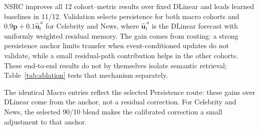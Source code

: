 NSRC improves all 12 cohort--metric results over fixed DLinear and leads learned baselines in 11/12. Validation selects persistence for both macro cohorts and $0.9\mathbf p+0.1\hat{\mathbf u}^{\,a}_t$ for Celebrity and News, where $\hat{\mathbf u}^{\,a}_t$ is the DLinear forecast with uniformly weighted residual memory. The gain comes from routing: a strong persistence anchor limits transfer when event-conditioned updates do not validate, while a small residual-path contribution helps in the other cohorts. These end-to-end results do not by themselves isolate semantic retrieval; Table~\ref{tab:ablation} tests that mechanism separately.

The identical Macro entries reflect the selected Persistence route: these gains over DLinear come from the anchor, not a residual correction. For Celebrity and News, the selected 90/10 blend makes the calibrated correction a small adjustment to that anchor.
